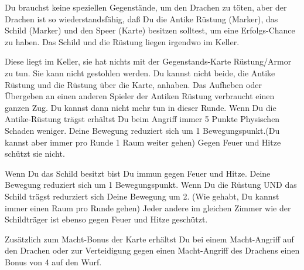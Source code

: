 





Du brauchst keine speziellen Gegenstände, um den Drachen zu töten, aber der Drachen ist so wiederstandsfähig, daß Du die Antike Rüstung (Marker), das Schild (Marker) und den Speer (Karte) besitzen solltest, um eine Erfolgs-Chance zu haben. Das Schild und die Rüstung liegen irgendwo im Keller.

Diese liegt im Keller, sie hat nichts mit der Gegenstands-Karte Rüstung/Armor zu tun. Sie kann nicht gestohlen werden. Du kannst nicht beide, die Antike Rüstung und die Rüstung über die Karte, anhaben.
Das Aufheben oder Übergeben an einen anderen Spieler der Antiken Rüstung verbraucht einen ganzen Zug. Du kannst dann nicht mehr tun in dieser Runde.
Wenn Du die Antike-Rüstung trägst erhältst Du beim Angriff immer 5 Punkte Physischen Schaden weniger.
Deine Bewegung reduziert sich um 1 Bewegungspunkt.(Du kannst aber immer pro Runde 1 Raum weiter gehen)
Gegen Feuer und Hitze schützt sie nicht.

Wenn Du das Schild besitzt bist Du immun gegen Feuer und Hitze. Deine Bewegung reduziert sich um 1 Bewegungspunkt. Wenn Du die Rüstung UND das Schild trägst redurziert sich Deine Bewegung um 2.
(Wie gehabt, Du kannst immer einen Raum pro Runde gehen)
Jeder andere im gleichen Zimmer wie der Schildträger ist ebenso gegen Feuer und Hitze geschützt.


Zusätzlich zum Macht-Bonus der Karte erhältst Du bei einem Macht-Angriff auf den Drachen oder zur Verteidigung gegen einen Macht-Angriff des Drachens einen Bonus von 4 auf den Wurf.




